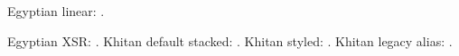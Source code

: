 \documentclass{impeart}
\begin{document}
Egyptian linear: .\par
Egyptian XSR: .
Khitan default stacked: .
Khitan styled: .
Khitan legacy alias: .
\end{document}
